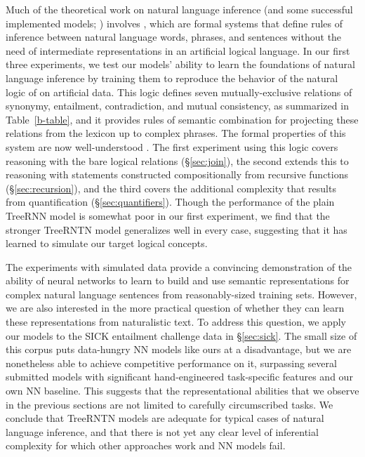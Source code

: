 Much of the
theoretical work on natural language inference (and some successful implemented models;
\citealt{maccartney2009extended,watanabe2012latent}) involves , which are formal systems that define rules of inference
between natural language words, phrases, and sentences without the
need of intermediate representations in an artificial logical
language.
In our first three experiments, we test our models' ability to learn the foundations of natural
language inference by training them to reproduce the behavior of the natural logic of  
on artificial data. This logic
defines seven mutually-exclusive relations of synonymy, entailment, contradiction,
and mutual consistency, as summarized in Table~\ref{b-table}, and it
provides rules of semantic combination for projecting these relations
from the lexicon up to complex phrases. The formal properties of this system 
are now well-understood \cite{Icard:Moss:2013,Icard:Moss:2013:LILT}.
The first experiment using this logic 
covers reasoning with the bare logical relations (\S\ref{sec:join}), the second extends this to reasoning with statements constructed compositionally from recursive functions (\S\ref{sec:recursion}),
and the third covers the additional complexity that results from quantification (\S\ref{sec:quantifiers}).
Though the performance of the plain TreeRNN model 
 is somewhat poor in our first experiment, we find that the stronger TreeRNTN model
  generalizes well in every case, suggesting that it has learned to simulate our target logical concepts.

The experiments with simulated data provide a convincing demonstration
of the ability of neural networks to learn to build and use semantic representations for complex natural language sentences from reasonably-sized
training sets. However, we are also interested in the more practical
question of whether they can learn these representations from
naturalistic text. To address this question, we apply our models to
the SICK entailment challenge data in \S\ref{sec:sick}. The small size of this corpus puts
data-hungry NN models like ours at a disadvantage, but we are
nonetheless able to achieve competitive performance on it,
surpassing several submitted models with significant hand-engineered task-specific features and our own NN baseline.
This suggests that the representational abilities that we observe in the previous sections
are not limited to carefully circumscribed tasks. We conclude that TreeRNTN models
are adequate for typical cases of natural language inference, and that there is not yet
any clear level of inferential complexity for which other approaches work and NN models fail.

